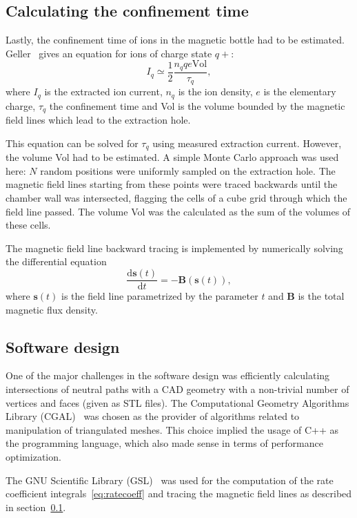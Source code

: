 \documentclass[a4paper,twoside,12pt]{article}
\begin{document}
\subsection{Calculating the confinement time}
\label{sec:confinement}
Lastly, the confinement time of ions in the magnetic bottle had to be estimated. Geller~\cite{geller:ecr} gives an equation for ions of charge state $q+$:
\begin{equation}
    \label{eq:confinement_time}
    I_q \simeq \frac{1}{2} \frac{n_q q e \mathrm{Vol}}{\tau_q},
\end{equation}
where $I_q$ is the extracted ion current, $n_q$ is the ion density, $e$ is the elementary charge, $\tau_q$ the confinement time and Vol is the volume bounded by the magnetic field lines which lead to the extraction hole.

This equation can be solved for $\tau_q$ using measured extraction current. However, the volume Vol had to be estimated. A simple Monte Carlo approach was used here: $N$ random positions were uniformly sampled on the extraction hole. The magnetic field lines starting from these points were traced backwards until the chamber wall was intersected, flagging the cells of a cube grid through which the field line passed. The volume Vol was the calculated as the sum of the volumes of these cells.

The magnetic field line backward tracing is implemented by numerically solving the differential equation
\begin{equation}
    \frac{\mathrm{d}\mathbf{s}(t)}{\mathrm{d}t} = -\mathbf{B}(\mathbf{s}(t)),
\end{equation}
where $\mathbf{s}(t)$ is the field line parametrized by the parameter $t$ and $\mathbf{B}$ is the total magnetic flux density.

\subsection{Software design}
One of the major challenges in the software design was efficiently calculating intersections of neutral paths with a CAD geometry with a non-trivial number of vertices and faces (given as STL files). The Computational Geometry Algorithms Library (\textsc{CGAL})~\cite{cgal} was chosen as the provider of algorithms related to manipulation of triangulated meshes. This choice implied the usage of \textsc{C++} as the programming language, which also made sense in terms of performance optimization.

The GNU Scientific Library (\textsc{GSL})~\cite{gsl} was used for the computation of the rate coefficient integrals~\eqref{eq:ratecoeff} and tracing the magnetic field lines as described in section~\ref{sec:confinement}.
\end{document}
